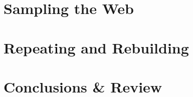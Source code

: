 \documentclass[11pt,oneside,a4paper]{lancsthesis}
\begin{document}
\chapter{Sampling the Web}



\chapter{Repeating and Rebuilding}



\chapter{Conclusions \& Review}






\end{document}
